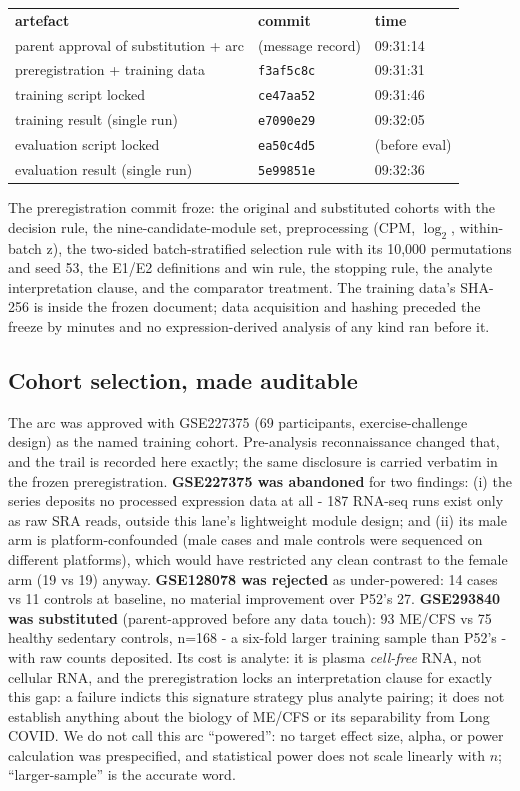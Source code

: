 \documentclass[11pt,a4paper]{article}
\begin{document}
\begin{longtable}{lll}
\textbf{artefact} & \textbf{commit} & \textbf{time}\\
parent approval of substitution + arc & (message record) & 09:31:14\\
preregistration + training data & \texttt{f3af5c8c} & 09:31:31\\
training script locked & \texttt{ce47aa52} & 09:31:46\\
training result (single run) & \texttt{e7090e29} & 09:32:05\\
evaluation script locked & \texttt{ea50c4d5} & (before eval)\\
evaluation result (single run) & \texttt{5e99851e} & 09:32:36\\
\end{longtable}

The preregistration commit froze: the original and substituted cohorts with
the decision rule, the nine-candidate-module set, preprocessing (CPM,
$\log_2$, within-batch z), the two-sided batch-stratified selection rule
with its 10{,}000 permutations and seed 53, the E1/E2 definitions and win
rule, the stopping rule, the analyte interpretation clause, and the
comparator treatment. The training data's SHA-256 is inside the frozen
document; data acquisition and hashing preceded the freeze by minutes and no
expression-derived analysis of any kind ran before it.
\subsection{Cohort selection, made auditable}
\label{sec:p53cohort}
The arc was approved with GSE227375 (69 participants, exercise-challenge
design) as the named training cohort. Pre-analysis reconnaissance changed
that, and the trail is recorded here exactly; the same disclosure is carried
verbatim in the frozen preregistration. \textbf{GSE227375 was abandoned}
for two findings: (i) the series deposits no processed expression data at all
- 187 RNA-seq runs exist only as raw SRA reads, outside this lane's
lightweight module design; and (ii) its male arm is platform-confounded
(male cases and male controls were sequenced on different platforms), which
would have restricted any clean contrast to the female arm (19 vs 19) anyway.
\textbf{GSE128078 was rejected} as under-powered: 14 cases vs 11 controls at
baseline, no material improvement over P52's 27. \textbf{GSE293840 was
substituted} (parent-approved before any data touch): 93 ME/CFS vs 75 healthy
sedentary controls, n=168 - a six-fold larger training sample than P52's -
with raw counts deposited. Its cost is analyte: it is plasma \emph{cell-free}
RNA, not cellular RNA, and the preregistration locks an interpretation clause
for exactly this gap: a failure indicts this signature strategy plus analyte
pairing; it does not establish anything about the biology of ME/CFS or its
separability from Long COVID. We do not call this arc ``powered'': no target
effect size, alpha, or power calculation was prespecified, and statistical
power does not scale linearly with $n$; ``larger-sample'' is the accurate
word.
\end{document}
